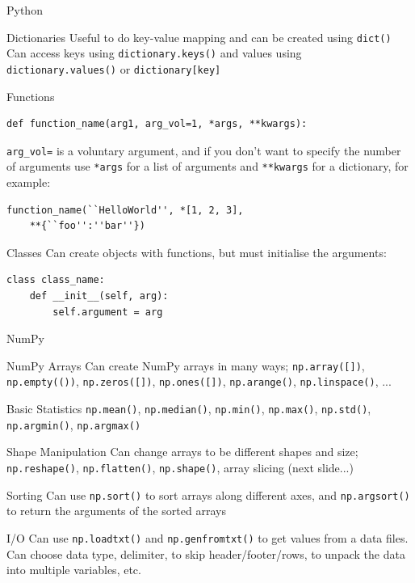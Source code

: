 \documentclass{beamer}
\begin{document}
\begin{frame}[fragile]{Python}
  \fontsize{10pt}{10}\selectfont
  \begin{block}{Dictionaries}
  	Useful to do key-value mapping and can be created using \texttt{dict()} \\
  	Can access keys using \texttt{dictionary.keys()} and values using \texttt{dictionary.values()} or \texttt{dictionary[key]}
  \end{block}
  \begin{block}{Functions}
       \begin{lstlisting} 
def function_name(arg1, arg_vol=1, *args, **kwargs):
       \end{lstlisting}
       \texttt{arg\_vol=} is a voluntary argument, and if you don't want to specify the number of arguments use \texttt{*args} for a list of arguments and \texttt{**kwargs} for a dictionary, for example:
       \begin{lstlisting}
function_name(``HelloWorld'', *[1, 2, 3], 
    **{``foo'':''bar''})
       \end{lstlisting}
  \end{block}
  \begin{block}{Classes}
       Can create objects with functions, but must initialise the arguments:
       \begin{lstlisting}
class class_name:
    def __init__(self, arg):
        self.argument = arg
       \end{lstlisting} 
  \end{block}
\end{frame}

\begin{frame}{NumPy}
  \fontsize{9pt}{9}\selectfont
  \begin{block}{NumPy Arrays}
      Can create NumPy arrays in many ways; \texttt{np.array([])}, \texttt{np.empty(())}, \texttt{np.zeros([])}, \texttt{np.ones([])}, \texttt{np.arange()}, \texttt{np.linspace()}, ...
  \end{block}
  \begin{block}{Basic Statistics}
     \texttt{np.mean()}, \texttt{np.median()}, \texttt{np.min()}, \texttt{np.max()}, \texttt{np.std()}, \texttt{np.argmin()}, \texttt{np.argmax()}
  \end{block}
  \begin{block}{Shape Manipulation}
    Can change arrays to be different shapes and size; \texttt{np.reshape()}, \texttt{np.flatten()}, \texttt{np.shape()}, array slicing (next slide...)
  \end{block}    
  \begin{block}{Sorting}
     Can use \texttt{np.sort()} to sort arrays along different axes, and \texttt{np.argsort()} to return the arguments of the sorted arrays
  \end{block}    
  \begin{block}{I/O}
     Can use \texttt{np.loadtxt()} and \texttt{np.genfromtxt()} to get values from a data files. Can choose data type, delimiter, to skip header/footer/rows, to unpack the data into multiple variables, etc. 
  \end{block}     
\end{frame}
\end{document}
